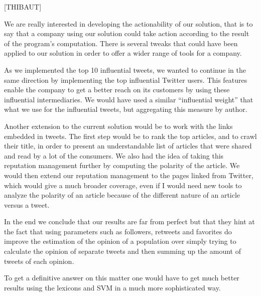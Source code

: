 \documentclass[a4paper,12pt]{report}
\begin{document}
[THIBAUT]

We are really interested in developing the actionability of our solution, that is to say that a company using our solution could take action according to the result of the program’s computation. There is several tweaks that could have been applied to our solution in order to offer a wider range of tools for a company.

As we implemented the top 10 influential tweets, we wanted to continue in the same direction by implementing the top influential Twitter users. This features enable the company to get a better reach on its customers by using these influential intermediaries. We would have used a similar “influential weight” that what we use for the influential tweets, but aggregating this measure by author.

Another extension to the current solution would be to work with the links embedded in tweets. The first step would be to rank the top articles, and to crawl their title, in order to present an understandable list of articles that were shared and read by a lot of the consumers. We also had the idea of taking this reputation management further by computing the polarity of the article. We would then extend our reputation management to the pages linked from Twitter, which would give a much broader coverage, even if I would need new tools to analyze the polarity of an article because of the different nature of an article versus a tweet.

In the end we conclude that our results are far from perfect but that they hint at the fact that using parameters such as followers, retweets and favorites do improve the estimation of the opinion of a population over simply trying to calculate the opinion of separate tweets and then summing up the amount of tweets of each opinion.

To get a definitive answer on this matter one would have to get much better results using the lexicons and SVM in a much more sophisticated way.
\end{document}
